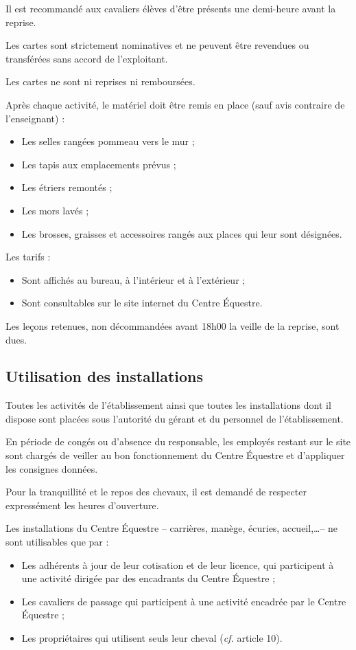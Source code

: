 \documentclass[11pt,a4paper]{article}
\begin{document}
Il est recommandé aux cavaliers élèves d'être présents une demi-heure avant la reprise.

Les cartes sont strictement nominatives et ne peuvent être revendues ou transférées sans accord de l'exploitant. \par
Les cartes ne sont ni reprises ni remboursées.

Après chaque activité, le matériel doit être remis en place (sauf avis contraire de l'enseignant) :
\begin{itemize}[leftmargin=50pt]
	\item
	Les selles rangées pommeau vers le mur ;
	\item
	Les tapis aux emplacements prévus ;
	\item
	Les étriers remontés ;
	\item
	Les mors lavés ;
	\item
	Les brosses, graisses et accessoires rangés aux places qui leur sont désignées.
\end{itemize}

Les tarifs :
\begin{itemize}[leftmargin=50pt]
\item
Sont affichés au bureau, à l'intérieur et à l'extérieur ;
\item
Sont consultables sur le site internet du Centre Équestre.
\end{itemize}

Les leçons retenues, non décommandées avant 18h00 la veille de la reprise, sont dues.

\subsection{Utilisation des installations}
Toutes les activités de l'établissement ainsi que toutes les installations dont il dispose sont placées sous l'autorité du gérant et du personnel de l'établissement. \par
En période de congés ou d'absence du responsable, les employés restant sur le site sont chargés de veiller au bon fonctionnement du Centre Équestre et d'appliquer les consignes données. \par
Pour la tranquillité et le repos des chevaux, il est demandé de respecter expressément les heures d'ouverture.

Les installations du Centre Équestre -- carrières, manège, écuries, accueil,\dots -- ne sont utilisables que par :
\begin{itemize}[leftmargin=50pt]
\item
Les adhérents à jour de leur cotisation et de leur licence, qui participent à une activité dirigée par des encadrants du Centre Équestre ;
\item
Les cavaliers \og de passage \fg{} qui participent à une activité encadrée par le Centre Équestre ;
\item
Les propriétaires qui utilisent seuls leur cheval (\textit{cf.} article 10).
\end{itemize}
\end{document}
